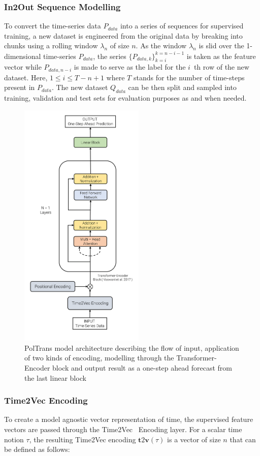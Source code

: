 \documentclass[twocolumn]{svjour3}          %
\begin{document}
\subsubsection{In2Out Sequence Modelling}
To convert the time-series data ${P_{data}}$ into a series of sequences for supervised training, a new dataset is engineered from the original data by breaking into chunks using a rolling window ${\lambda_n}$ of size ${n}$. As the window ${\lambda_n}$ is slid over the 1-dimensional time-series ${P_{data}}$, the series $\{{P_{data, k}}\}^{k=n-i-1}_{k=i}$ is taken as the feature vector while ${P_{data, n-i}}$ is made to serve as the label for the ${i}$~th row of the new dataset. Here, ${1 \leq i \leq {T - n + 1}}$ where ${T}$ stands for the number of time-steps present in ${P_{data}}$. The new dataset ${Q_{data}}$ can be then split and sampled into training, validation and test sets for evaluation purposes as and when needed.

\begin{figure}[h]
\centering
\includegraphics[height=12cm]{./model-architecture.png}
\caption{{PolTrans} model architecture describing the flow of input, application of two kinds of encoding, modelling through the Transformer-Encoder block and output result as a one-step ahead forecast from the last linear block}
\label{fig:model-archi}
\end{figure}

\subsubsection{Time2Vec Encoding}
To create a model agnostic vector representation of time, the supervised feature vectors are passed through the Time2Vec~\cite{Kazemi.2019} Encoding layer. For a scalar time notion ${\tau}$, the resulting Time2Vec encoding ${\mathbf{t} 2 \mathbf{v}(\tau)}$ is a vector of size ${n}$ that can be defined as follows:
\end{document}
